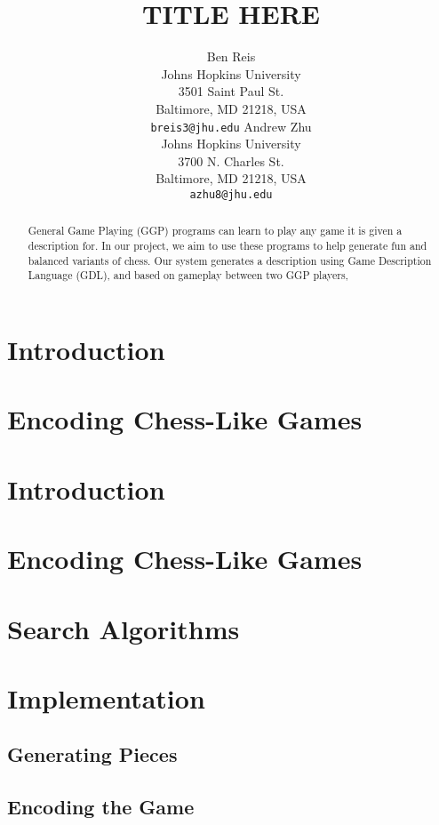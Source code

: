\documentclass[11pt,letterpaper]{article}
\title{TITLE HERE}
\author{Ben Reis \\
  Johns Hopkins University\\
  3501 Saint Paul St.\\
  Baltimore, MD 21218, USA\\
  {\tt breis3@jhu.edu}
  \And
  Andrew Zhu \\
  Johns Hopkins University \\
  3700 N. Charles St. \\
  Baltimore, MD 21218, USA\\
  {\tt azhu8@jhu.edu}}
\date{}
\begin{document}
\maketitle
\begin{abstract}
General Game Playing (GGP) programs can learn to play any game it is given a description for. In our project, we aim to use these programs to help generate fun and balanced variants of chess. Our system generates a description using Game Description Language (GDL), and based on gameplay between two GGP players,  
\end{abstract}

\section{Introduction}

\section{Encoding Chess-Like Games}

\section{Introduction}


\section{Encoding Chess-Like Games}

\section{Search Algorithms}

\section{Implementation}
\subsection{Generating Pieces}

\subsection{Encoding the Game}
\end{document}
